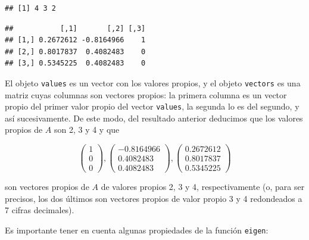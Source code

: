 \documentclass[]{book}
\newenvironment{Shaded}{\begin{snugshade}}{\end{snugshade}}
\newcommand{\KeywordTok}[1]{\textcolor[rgb]{0.13,0.29,0.53}{\textbf{#1}}}
\newcommand{\NormalTok}[1]{#1}
\newcommand{\OperatorTok}[1]{\textcolor[rgb]{0.81,0.36,0.00}{\textbf{#1}}}
\theoremstyle{definition}
\theoremstyle{definition}
\theoremstyle{definition}
\theoremstyle{remark}
\begin{document}
\begin{Shaded}
\end{Shaded}

\begin{verbatim}
## [1] 4 3 2
\end{verbatim}

\begin{Shaded}
\end{Shaded}

\begin{verbatim}
##           [,1]       [,2] [,3]
## [1,] 0.2672612 -0.8164966    1
## [2,] 0.8017837  0.4082483    0
## [3,] 0.5345225  0.4082483    0
\end{verbatim}

El objeto \texttt{values} es un vector con los valores propios, y el objeto \texttt{vectors} es una matriz cuyas columnas son vectores propios: la primera columna es un vector propio del primer valor propio del vector \texttt{values}, la segunda lo es del segundo, y así sucesivamente. De este modo, del resultado anterior deducimos que los valores propios de \(A\) son 2, 3 y 4 y que

\[
\left(\begin{array}{c} 1 \\ 0 \\ 0\end{array}\right),
\left(\begin{array}{c} -0.8164966 \\ 0.4082483 \\ 0.4082483\end{array}\right),
\left(\begin{array}{c} 0.2672612 \\ 0.8017837 \\ 0.5345225\end{array}\right)
\]

son vectores propios de \(A\) de valores propios 2, 3 y 4, respectivamente (o, para ser precisos, los dos últimos son vectores propios de valor propio 3 y 4 redondeados a 7 cifras decimales).

Es importante tener en cuenta algunas propiedades de la función \texttt{eigen}:
\end{document}
